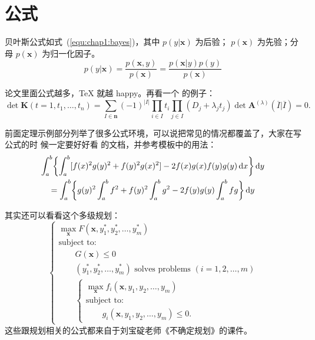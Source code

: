 \section{公式}
\label{sec:equation}
\renewcommand\vec{\symbf}
\newcommand\mat{\symbf}
贝叶斯公式如式~(\ref{equ:chap1:bayes})，其中 $p(y|\vec{x})$ 为后验；
$p(\vec{x})$ 为先验；分母 $p(\vec{x})$ 为归一化因子。
\begin{equation}
\label{equ:chap1:bayes}
p(y|\vec{x}) = \frac{p(\vec{x},y)}{p(\vec{x})}=
\frac{p(\vec{x}|y)p(y)}{p(\vec{x})}
\end{equation}

论文里面公式越多，\TeX{} 就越 happy。再看一个  的例子：
\newcommand{\envert}[1]{\left\lvert#1\right\rvert}
\begin{equation}\label{detK2}
\det\mat{K}(t=1,t_1,\dots,t_n)=\sum_{I\in\vec{n}}(-1)^{\envert{I}}
\prod_{i\in I}t_i\prod_{j\in I}(D_j+\lambda_jt_j)\det\vec{A}
^{(\lambda)}(\overline{I}|\overline{I})=0.
\end{equation}

前面定理示例部分列举了很多公式环境，可以说把常见的情况都覆盖了，大家在写公式的时
候一定要好好看  的文档，并参考模板中的用法：
\begin{multline*}%
\int_a^b\biggl\{\int_a^b[f(x)^2g(y)^2+f(y)^2g(x)^2]
 -2f(x)g(x)f(y)g(y)\dif x\biggr\}\dif y \\
 =\int_a^b\biggl\{g(y)^2\int_a^bf^2+f(y)^2
  \int_a^b g^2-2f(y)g(y)\int_a^b fg\biggr\}\dif y
\end{multline*}

其实还可以看看这个多级规划：
\begin{equation}
  \label{bilevel}
  \begin{cases}
    \max_{\bm{x}} F(\bm{x}, y_1^*, y_2^*, \dots, y_m^*) \\
      \text{subject to:} \\
      \qquad G(\bm{x}) \le 0 \\
      \qquad (y_1^*, y_2^*, \dots, y_m^*) \text{ solves problems }
        (i = 1, 2, \dots, m) \\
      \qquad
        \begin{cases}
          \max_{\bm{x}} f_i(\bm{x}, y_1, y_2, \dots, y_m) \\
          \text{subject to:} \\
          \qquad g_i(\bm{x}, y_1, y_2, \dots, y_m) \le 0.
        \end{cases}
  \end{cases}
\end{equation}
这些跟规划相关的公式都来自于刘宝碇老师《不确定规划》的课件。
